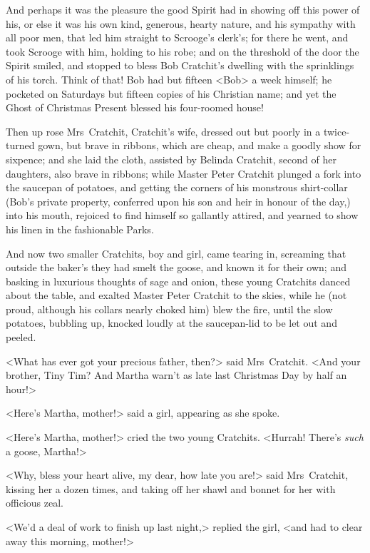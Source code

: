 And perhaps it was the pleasure the good Spirit had in showing off this power of his, or else it was his own kind, generous, hearty nature, and his sympathy with all poor men, that led him straight to Scrooge's clerk's; for there he went, and took Scrooge with him, holding to his robe; and on the threshold of the door the Spirit smiled, and stopped to bless Bob Cratchit's dwelling with the sprinklings of his torch. Think of that! Bob had but fifteen <Bob> a week himself; he pocketed on Saturdays but fifteen copies of his Christian name; and yet the Ghost of Christmas Present blessed his four-roomed house!



Then up rose Mrs~Cratchit, Cratchit's wife, dressed out but poorly in a twice-turned gown, but brave in ribbons, which are cheap, and make a goodly show for sixpence; and she laid the cloth, assisted by Belinda Cratchit, second of her daughters, also brave in ribbons; while Master Peter Cratchit plunged a fork into the saucepan of potatoes, and getting the corners of his monstrous shirt-collar (Bob's private property, conferred upon his son and heir in honour of the day,) into his mouth, rejoiced to find himself so gallantly attired, and yearned to show his linen in the fashionable Parks. 

And now two smaller Cratchits, boy and girl, came tearing in, screaming that outside the baker's they had smelt the goose, and known it for their own; and basking in luxurious thoughts of sage and onion, these young Cratchits danced about the table, and exalted Master Peter Cratchit to the skies, while he (not proud, although his collars nearly choked him) blew the fire, until the slow potatoes, bubbling up, knocked loudly at the saucepan-lid to be let out and peeled.

<What has ever got your precious father, then?> said Mrs~Cratchit. <And your brother, Tiny Tim? And Martha warn't as late last Christmas Day by half an hour!>

<Here's Martha, mother!> said a girl, appearing as she spoke.

<Here's Martha, mother!> cried the two young Cratchits. <Hurrah! There's \textit{such} a goose, Martha!>

<Why, bless your heart alive, my dear, how late you are!> said Mrs~Cratchit, kissing her a dozen times, and taking off her shawl and bonnet for her with officious zeal.

<We'd a deal of work to finish up last night,> replied the girl, <and had to clear away this morning, mother!>


